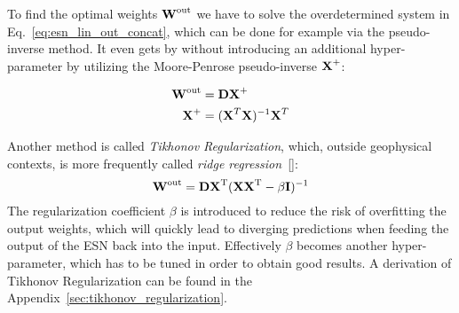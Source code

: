 To find the optimal weights $\boldsymbol{\textbf{W}}^{\text{out}}$ we have to solve the overdetermined
system in Eq.~\ref{eq:esn_lin_out_concat}, which can be done for example via
the pseudo-inverse method.  It even gets by without introducing an
additional hyper-parameter by utilizing the Moore-Penrose pseudo-inverse
$\boldsymbol{\textbf{X}}^+$:

\begin{align}
  \boldsymbol{\textbf{W}}^{\text{out}} &= \boldsymbol{\textbf{D}}\boldsymbol{\textbf{X}}^+ \\
  \boldsymbol{\textbf{X}}^+  &= (\boldsymbol{\textbf{X}}^T\boldsymbol{\textbf{X}})^{-1} \boldsymbol{\textbf{X}}^T
\end{align}



Another method is called \emph{Tikhonov Regularization}, which, outside
geophysical contexts, is more frequently called \emph{ridge
regression}~[\cite{MontgomeryRegression}]:
\begin{equation}
  \label{eq:tikhonov}
  \boldsymbol{\textbf{W}}^{\text{out}} = \boldsymbol{\textbf{D}} \boldsymbol{\textbf{X}}^{\text{T}} (\boldsymbol{\textbf{X}} \boldsymbol{\textbf{X}}^{\text{T}} - \beta \boldsymbol{\textbf{I}})^{-1}
\end{equation}
The regularization coefficient $\beta$ is introduced to reduce the risk of
overfitting the output weights, which will quickly lead to diverging
predictions when feeding the output of the ESN back into the input.
Effectively $\beta$ becomes another hyper-parameter, which has to be tuned in
order to obtain good results.  A derivation of Tikhonov Regularization can be
found in the Appendix~\ref{sec:tikhonov_regularization}.  
